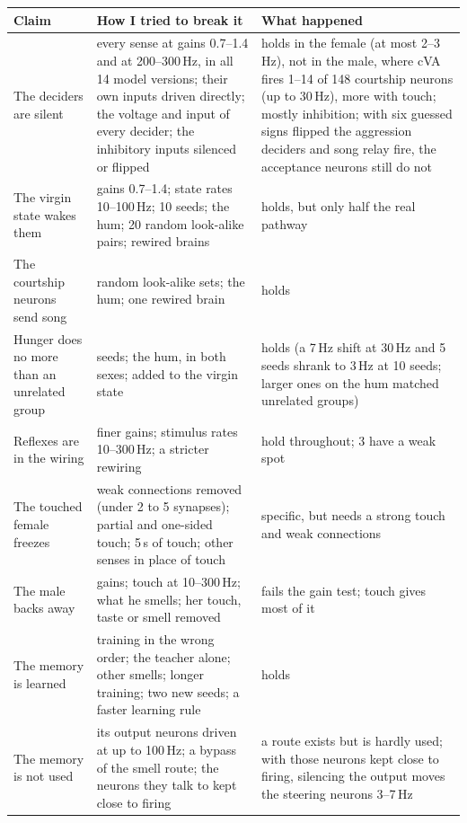 \begin{table}[tbp]
\centering
\small
\renewcommand{\arraystretch}{1.12}
\begin{tabularx}{\textwidth}{@{}>{\RaggedRight}p{3.9cm}>{\RaggedRight}X>{\RaggedRight\arraybackslash}p{3.3cm}@{}}
\toprule
\textbf{Claim} & \textbf{How I tried to break it} & \textbf{What happened} \\
\midrule
The deciders are silent & every sense at gains 0.7--1.4 and at 200--300\,Hz, in all 14 model versions; their own inputs driven directly; the voltage and input of every decider; the inhibitory inputs silenced or flipped & holds in the female (at most 2--3\,Hz), not in the male, where cVA fires 1--14 of 148 courtship neurons (up to 30\,Hz), more with touch; mostly inhibition; with six guessed signs flipped the aggression deciders and song relay fire, the acceptance neurons still do not \\
The virgin state wakes them & gains 0.7--1.4; state rates 10--100\,Hz; 10 seeds; the hum; 20 random look-alike pairs; rewired brains & holds, but only half the real pathway \\
The courtship neurons send song & 20 random look-alike sets; the hum; one rewired brain & holds \\
Hunger does no more than an unrelated group & 10 seeds; the hum, in both sexes; added to the virgin state & holds (a 7\,Hz shift at 30\,Hz and 5 seeds shrank to 3\,Hz at 10 seeds; larger ones on the hum matched unrelated groups) \\
Reflexes are in the wiring & finer gains; stimulus rates 10--300\,Hz; a stricter rewiring & 2 hold throughout; 3 have a weak spot \\
The touched female freezes & weak connections removed (under 2 to 5 synapses); partial and one-sided touch; 5\,s of touch; other senses in place of touch & specific, but needs a strong touch and weak connections \\
The male backs away & gains; touch at 10--300\,Hz; what he smells; her touch, taste or smell removed & fails the gain test; touch gives most of it \\
The memory is learned & training in the wrong order; the teacher alone; other smells; longer training; two new seeds; a faster learning rule & holds \\
The memory is not used & its output neurons driven at up to 100\,Hz; a bypass of the smell route; the neurons they talk to kept close to firing & a route exists but is hardly used; with those neurons kept close to firing, silencing the output moves the steering neurons 3--7\,Hz \\

\end{tabularx}
\end{table}
